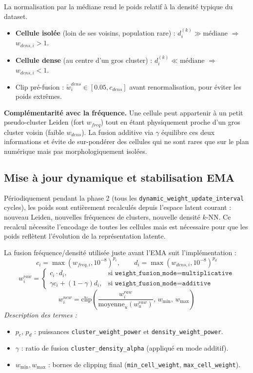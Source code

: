\documentclass[11pt,a4paper]{article}
\begin{document}
La normalisation par la m\'ediane rend le poids relatif \`a la densit\'e typique du dataset.

\begin{itemize}[nosep]
  \item \textbf{Cellule isol\'ee} (loin de ses voisins, population rare) : $d_i^{(k)} \gg \text{m\'ediane}$ $\Rightarrow$ $w_{dens,i} > 1$.
  \item \textbf{Cellule dense} (au centre d'un gros cluster) : $d_i^{(k)} \ll \text{m\'ediane}$ $\Rightarrow$ $w_{dens,i} < 1$.
  \item Clip pr\'e-fusion : $\tilde{w}^{dens}_i \in [0.05, c_{dens}]$ avant renormalisation, pour \'eviter les poids extr\^emes.
\end{itemize}

\textbf{Compl\'ementarit\'e avec la fr\'equence.} Une cellule peut appartenir \`a un petit pseudo-cluster Leiden (fort $w_{freq}$) tout en \'etant physiquement proche d'un gros cluster voisin (faible $w_{dens}$). La fusion additive via $\gamma$ \'equilibre ces deux informations et \'evite de sur-pond\'erer des cellules qui ne sont rares que sur le plan num\'erique mais pas morphologiquement isol\'ees.

\subsection{Mise \`a jour dynamique et stabilisation EMA}

P\'eriodiquement pendant la phase 2 (tous les \texttt{dynamic\_weight\_update\_interval} cycles), les poids sont enti\`erement recalcul\'es depuis l'espace latent courant : nouveau Leiden, nouvelles fr\'equences de clusters, nouvelle densit\'e $k$-NN. Ce recalcul n\'ecessite l'encodage de toutes les cellules mais est n\'ecessaire pour que les poids refl\`etent l'\'evolution de la repr\'esentation latente.

La fusion fr\'equence/densit\'e utilis\'ee juste avant l'EMA suit l'impl\'ementation :
\[
  c_i=\max(w_{freq,i},10^{-8})^{p_c},\qquad d_i=\max(w_{dens,i},10^{-8})^{p_d}
\]
\[
  w_i^{raw}=
  \begin{cases}
    c_i\cdot d_i, & \text{si }\texttt{weight\_fusion\_mode}=\texttt{multiplicative}\\
    \gamma c_i + (1-\gamma)d_i, & \text{si }\texttt{weight\_fusion\_mode}=\texttt{additive}
  \end{cases}
\]
\[
  w_i^{new}=\mathrm{clip}\!\left(\frac{w_i^{raw}}{\mathrm{moyenne}_{u}(w_u^{raw})},\,w_{\min},\,w_{\max}\right)
\]
\textit{Description des termes :}
\begin{itemize}[nosep]
  \item $p_c$, $p_d$ : puissances \texttt{cluster\_weight\_power} et \texttt{density\_weight\_power}.
  \item $\gamma$ : ratio de fusion \texttt{cluster\_density\_alpha} (appliqu\'e en mode additif).
  \item $w_{\min},w_{\max}$ : bornes de clipping final (\texttt{min\_cell\_weight}, \texttt{max\_cell\_weight}).
\end{itemize}
\end{document}
